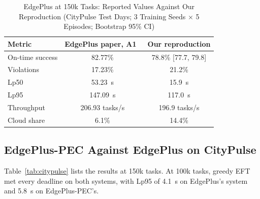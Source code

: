 \documentclass[11pt,journal,onecolumn]{IEEEtran}
\begin{document}
\begin{table}[!t]
\centering
\caption{EdgePlus at 150k Tasks: Reported Values Against Our Reproduction (CityPulse Test Days; 3 Training Seeds $\times$ 5 Episodes; Bootstrap 95\% CI)}
\label{tab:repro}
\footnotesize
\begin{tabular}{lcc}
\toprule
Metric & EdgePlus paper, A1~\cite{edgeplus} & Our reproduction\\
\midrule
On-time success & 82.77\% & 78.8\% [77.7, 79.8]\\
Violations & 17.23\% & 21.2\%\\
Lp50 & 53.23~s & 15.9~s\\
Lp95 & 147.09~s & 117.0~s\\
Throughput & 206.93 tasks/s & 196.9 tasks/s\\
Cloud share & 6.1\% & 14.4\%\\
\bottomrule
\end{tabular}
\end{table}

\subsection{EdgePlus-PEC Against EdgePlus on CityPulse}
Table~\ref{tab:citypulse} lists the results at 150k tasks. At 100k tasks, greedy EFT met every deadline on both systems, with Lp95 of 4.1~s on EdgePlus's system and 5.8~s on EdgePlus-PEC's.
\end{document}
